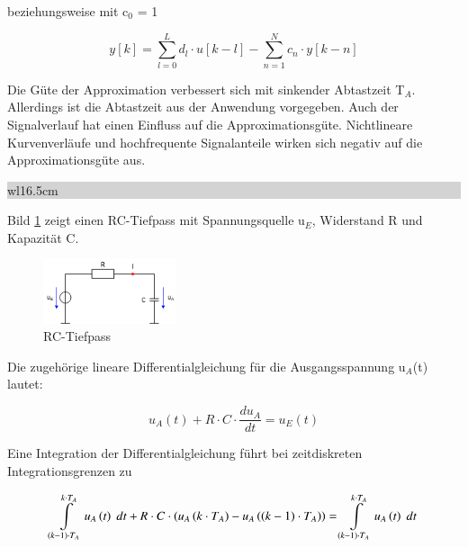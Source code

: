 \noindent beziehungsweise mit c${}_{0}$ = 1

\begin{equation}\label{eq:fourten}
y\left[k\right]=\sum _{l=0}^{L}d_{l} \cdot u\left[k-l\right] -\sum _{n=1}^{N}c_{n} \cdot y\left[k-n\right]
\end{equation}

\noindent Die G\"{u}te der Approximation verbessert sich mit sinkender Abtastzeit T${}_{A}$. Allerdings ist die Abtastzeit aus der Anwendung vorgegeben. Auch der Signalverlauf hat einen Einfluss auf die Approximationsg\"{u}te. Nichtlineare Kurvenverl\"{a}ufe und hochfrequente Signalanteile wirken sich negativ auf die Approximationsg\"{u}te aus.\bigskip

\noindent
\colorbox{lightgray}{%
%
\renewcommand\arraystretch{0.6}%
\begin{tabular}{ wl{16.5cm} }
{\selectfont{Beispiel: RC-Tiefpass}}
\end{tabular}%
}\medskip

\noindent Bild \ref{fig:RCTiefpass} zeigt einen RC-Tiefpass mit Spannungsquelle u${}_{E}$, Widerstand R und Kapazit\"{a}t C.

\begin{figure}[H]
  \centerline{\includegraphics[width=0.35\textwidth]{Kapitel4/Bilder/image5.png}}
  \caption{RC-Tiefpass}
  \label{fig:RCTiefpass}
\end{figure}

\noindent Die zugeh\"{o}rige lineare Differentialgleichung f\"{u}r die Ausgangsspannung u${}_{A}$(t) lautet:

\begin{equation}\label{eq:foureleven}
u_{A} \left(t\right)+R\cdot C\cdot \frac{du_{A} }{dt} =u_{E} \left(t\right)
\end{equation}

\noindent Eine Integration der Differentialgleichung f\"{u}hrt bei zeitdiskreten Integrationsgrenzen zu

\begin{equation}\label{eq:fourtwelve}
\int\limits _{\left(k-1\right)\cdot T_{A} }^{k\cdot T_{A} }u_{A} \left(t\right){\rm \; } dt+R\cdot C\cdot \left(u_{A} \left(k\cdot T_{A} \right)-u_{A} \left(\left(k-1\right)\cdot T_{A} \right)\right)=\int\limits _{\left(k-1\right)\cdot T_{A} }^{k\cdot T_{A} }u_{A} \left(t\right){\rm \; } dt
\end{equation}

